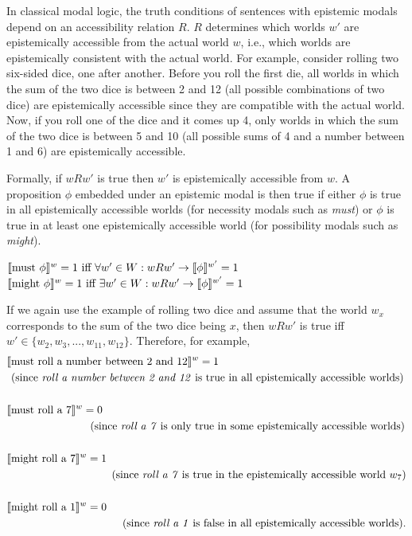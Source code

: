 In classical modal logic, the truth conditions of sentences with epistemic modals depend on an accessibility relation $R$.
$R$ determines which worlds $w'$ are epistemically accessible from the actual world $w$, i.e., which worlds are epistemically consistent with
the actual world. For example, consider rolling two six-sided dice, one after another. Before you roll the first die, all worlds in which the sum of
the two dice is between 2 and 12 (all possible combinations of two dice) are epistemically accessible since they are compatible with the actual
world. Now, if you roll one of the dice and it comes up 4, only worlds in which the sum of the two dice is between 5 and 10 (all possible sums of 4 and 
a number between 1 and 6) are epistemically accessible. 

Formally, if $wRw'$ is true then $w'$ is epistemically accessible from $w$. A proposition $\phi$ embedded under an epistemic modal is then true
if either $\phi$ is  true in all epistemically accessible worlds (for necessity modals such as \textit{must}) or $\phi$ is true in at least one epistemically 
accessible world (for possibility modals such as \textit{might}).

\begin{exe}
\ex \label{ex:modall-must} $\llbracket\mbox{must } \phi\rrbracket^{w}  = 1 \mbox{ iff } \forall w' \in W: wRw' \rightarrow  \llbracket\phi\rrbracket^{w'} = 1$
\ex \label{ex:modall-might} $\llbracket\mbox{might } \phi\rrbracket^{w}  = 1 \mbox{ iff } \exists w' \in W: wRw' \rightarrow  \llbracket\phi\rrbracket^{w'} = 1$
\end{exe}

If we again use the example of rolling two dice and assume that the world $w_x$ corresponds to the sum 
of the two dice being $x$, then $wRw'$ is true iff $w' \in \{w_2, w_3, ..., w_{11}, w_{12}\}$. Therefore, for example,
\begin{align*}
\llbracket&\mbox{must roll a number between 2 and 12}\rrbracket^{w} =  1 \\
 & \mbox{(since \textit{roll a number between 2 and 12} is true in all epistemically accessible worlds)} \\ \\ 
 \llbracket&\mbox{must roll a 7}\rrbracket^{w} =  0 \\
 & \qquad \qquad \qquad \quad \mbox{ (since \textit{roll a 7} is only true in some epistemically accessible worlds)} \\ \\
 \llbracket&\mbox{might roll a 7}\rrbracket^{w} =  1 \\
 &  \qquad \qquad \qquad \qquad \quad \mbox{ (since \textit{roll a 7} is true in the epistemically accessible world }w_7\mbox{)}\\ \\ 
 \llbracket&\mbox{might roll a 1}\rrbracket^{w} =  0 \\
 &  \qquad \qquad \qquad \qquad \qquad \mbox{\  (since \textit{roll a 1} is false in all epistemically accessible worlds).}
\end{align*}

